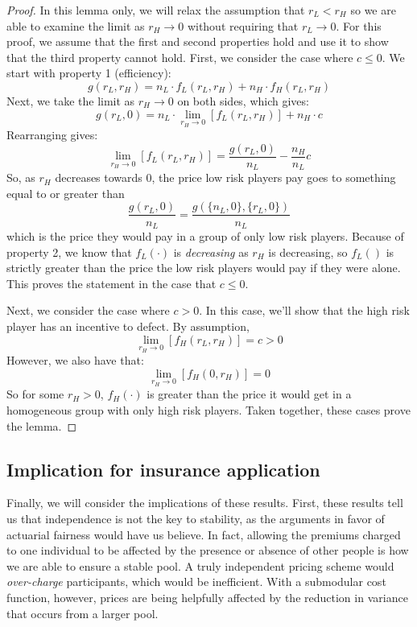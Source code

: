 \documentclass[sigconf]{acmart}
\newcommand{\br}[1]{\left[ #1 \right]}
\newcommand{\nL}[0]{\ensuremath{n_L}}
\newcommand{\nH}[0]{\ensuremath{n_H}}
\newcommand{\rL}[0]{\ensuremath{r_L}}
\newcommand{\rH}[0]{\ensuremath{r_H}}
\newcommand{\cost}[0]{\ensuremath{g}}
\newcommand{\priceL}[0]{\ensuremath{f_L}}
\newcommand{\priceH}[0]{\ensuremath{f_H}}
\newcommand{\cd}[0]{\cdot}
\begin{document}
\begin{proof}
In this lemma only, we will relax the assumption that $\rL < \rH$ so we are able to examine the limit as $\rH \rightarrow 0$ without requiring that $\rL \rightarrow 0$. For this proof, we assume that the first and second properties hold and use it to show that the third property cannot hold. First, we consider the case where $c \leq 0$. We start with property 1 (efficiency): 
$$ \cost(\rL, \rH)=\nL \cd\priceL(\rL, \rH) + \nH \cd \priceH(\rL, \rH)$$
Next, we take the limit as $\rH \rightarrow 0$ on both sides, which gives: 
$$ \cost(\rL, 0)=\nL \cd \lim_{\rH \rightarrow 0}\br{\priceL(\rL, \rH)} + \nH \cd c$$
Rearranging gives: 
$$\lim_{\rH \rightarrow 0}\br{\priceL(\rL, \rH)} = \frac{\cost(\rL, 0)}{\nL} - \frac{\nH}{\nL}c$$
So, as $\rH $ decreases towards 0, the price low risk players pay goes to something equal to or greater than $$\frac{\cost(\rL, 0)}{\nL} = \frac{\cost(\{\nL, 0\}, \{\rL, 0\})}{\nL}$$
which is the price they would pay in a group of only low risk players. Because of property 2, we know that $\priceL(\cdot)$ is \emph{decreasing} as $\rH$ is decreasing, so $\priceL()$ is strictly greater than the price the low risk players would pay if they were alone. This proves the statement in the case that $c\leq 0$. 

Next, we consider the case where $c>0$. In this case, we'll show that the high risk player has an incentive to defect. By assumption, 
$$\lim_{\rH\rightarrow 0}\br{\priceH(\rL, \rH)} = c > 0$$
However, we also have that:
$$\lim_{\rH\rightarrow 0}\br{\priceH(0, \rH)} = 0$$
So for some $\rH >0$, $\priceH(\cdot)$ is greater than the price it would get in a homogeneous group with only high risk players. Taken together, these cases prove the lemma. 
\end{proof}

\subsection{Implication for insurance application}
Finally, we will consider the implications of these results. First, these results tell us that independence is not the key to stability, as the arguments in favor of actuarial fairness would have us believe. In fact, allowing the premiums charged to one individual to be affected by the presence or absence of other people is how we are able to ensure a stable pool. A truly independent pricing scheme would \emph{over-charge} participants, which would be inefficient. With a submodular cost function, however, prices are being helpfully affected by the reduction in variance that occurs from a larger pool. 
\end{document}
